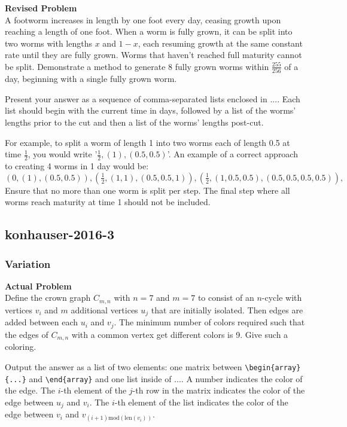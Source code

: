 \textbf{Revised Problem}\\
A footworm increases in length by one foot every day, ceasing growth upon reaching a length of one foot. When a worm is fully grown, it can be split into two worms with lengths $x$ and $1-x$, each resuming growth at the same constant rate until they are fully grown. Worms that haven't reached full maturity cannot be split. Demonstrate a method to generate 8 fully grown worms within $\frac{255}{256}$ of a day, beginning with a single fully grown worm.

Present your answer as a sequence of comma-separated lists enclosed in $\boxed{...}$. Each list should begin with the current time in days, followed by a list of the worms' lengths prior to the cut and then a list of the worms' lengths post-cut.

For example, to split a worm of length 1 into two worms each of length 0.5 at time $\frac{1}{2}$, you would write '$\frac{1}{2}, (1), (0.5, 0.5)$'. An example of a correct approach to creating 4 worms in 1 day would be:
$\boxed{
    (0, (1), (0.5, 0.5)),
    (\frac{1}{2}, (1, 1), (0.5, 0.5, 1)),
    (\frac{1}{2}, (1, 0.5, 0.5), (0.5, 0.5, 0.5, 0.5)),
}$
Ensure that no more than one worm is split per step. The final step where all worms reach maturity at time 1 should not be included.

\subsection{konhauser-2016-3}
\subsubsection{Variation}
\textbf{Actual Problem}\\
Define the crown graph $C_{m, n}$ with $n = 7$ and $m = 7$ to consist of an $n$-cycle with vertices $v_i$ and $m$ additional vertices $u_j$ that are initially isolated. Then edges are added between each $u_i$ and $v_j$. The minimum number of colors required such that the edges of $C_{m, n}$ with a common vertex get different colors is 9. Give such a coloring.

Output the answer as a list of two elements: one matrix between \verb|\begin{array}{...}| and \verb|\end{array}| and one list inside of $\boxed{...}$. A number indicates the color of the edge. The $i$-th element of the $j$-th row in the matrix indicates the color of the edge between $u_j$ and $v_i$. The $i$-th element of the list indicates the color of the edge between $v_i$ and $v_{(i+1) \text{mod}(\text{len}(v_i))}$.

